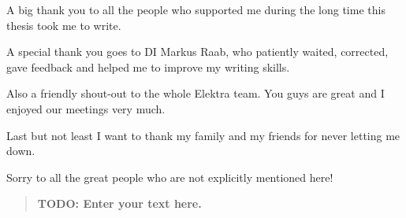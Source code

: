 \documentclass[draft,final]{vutinfth} %
\newcommand{\todo}[1]{{\color{red}\textbf{TODO: {#1}}}} %
\begin{document}
\frontmatter %

\addstatementpage

\begin{acknowledgements*}
A big thank you to all the people who supported me during the long time this thesis took me to write.

A special thank you goes to DI Markus Raab, who patiently waited, corrected, gave feedback and helped me to improve my writing skills.

Also a friendly shout-out to the whole Elektra team.
You guys are great and I enjoyed our meetings very much.

Last but not least I want to thank my family and my friends for never letting me down.

Sorry to all the great people who are not explicitly mentioned here!
\end{acknowledgements*}

\begin{abstract}
\todo{Enter your text here.}
\end{abstract}


\tableofcontents %

\mainmatter







\appendix
%


\backmatter

\listoffigures %

\newpage
\listoftables %




\newpage
\lstlistoflistings



\end{document}
